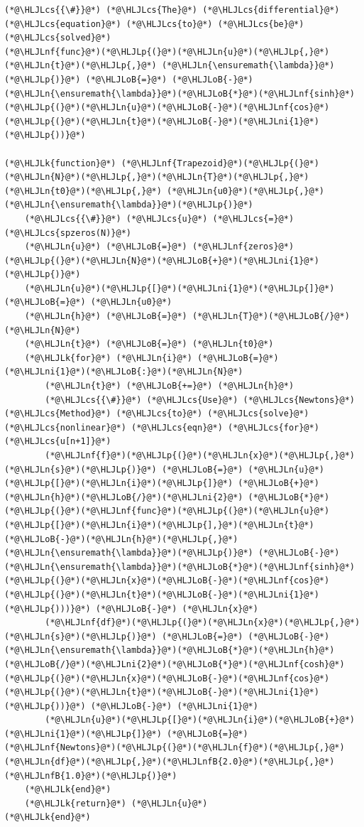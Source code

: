 \documentclass[12pt,a4paper]{article}
\newcommand{\HLJLk}[1]{\textcolor[RGB]{148,91,176}{\textbf{#1}}}
\newcommand{\HLJLn}[1]{#1}
\newcommand{\HLJLnf}[1]{\textcolor[RGB]{66,102,213}{#1}}
\newcommand{\HLJLnfB}[1]{\textcolor[RGB]{59,151,46}{#1}}
\newcommand{\HLJLni}[1]{\textcolor[RGB]{59,151,46}{#1}}
\newcommand{\HLJLoB}[1]{\textcolor[RGB]{102,102,102}{\textbf{#1}}}
\newcommand{\HLJLp}[1]{#1}
\newcommand{\HLJLcs}[1]{\textcolor[RGB]{153,153,119}{\textit{#1}}}
\begin{document}
\begin{lstlisting}
(*@\HLJLcs{{\#}}@*) (*@\HLJLcs{The}@*) (*@\HLJLcs{differential}@*) (*@\HLJLcs{equation}@*) (*@\HLJLcs{to}@*) (*@\HLJLcs{be}@*) (*@\HLJLcs{solved}@*)
(*@\HLJLnf{func}@*)(*@\HLJLp{(}@*)(*@\HLJLn{u}@*)(*@\HLJLp{,}@*) (*@\HLJLn{t}@*)(*@\HLJLp{,}@*) (*@\HLJLn{\ensuremath{\lambda}}@*)(*@\HLJLp{)}@*) (*@\HLJLoB{=}@*) (*@\HLJLoB{-}@*)(*@\HLJLn{\ensuremath{\lambda}}@*)(*@\HLJLoB{*}@*)(*@\HLJLnf{sinh}@*)(*@\HLJLp{(}@*)(*@\HLJLn{u}@*)(*@\HLJLoB{-}@*)(*@\HLJLnf{cos}@*)(*@\HLJLp{(}@*)(*@\HLJLn{t}@*)(*@\HLJLoB{-}@*)(*@\HLJLni{1}@*)(*@\HLJLp{))}@*)

(*@\HLJLk{function}@*) (*@\HLJLnf{Trapezoid}@*)(*@\HLJLp{(}@*)(*@\HLJLn{N}@*)(*@\HLJLp{,}@*)(*@\HLJLn{T}@*)(*@\HLJLp{,}@*)(*@\HLJLn{t0}@*)(*@\HLJLp{,}@*) (*@\HLJLn{u0}@*)(*@\HLJLp{,}@*) (*@\HLJLn{\ensuremath{\lambda}}@*)(*@\HLJLp{)}@*)
    (*@\HLJLcs{{\#}}@*) (*@\HLJLcs{u}@*) (*@\HLJLcs{=}@*) (*@\HLJLcs{spzeros(N)}@*)
    (*@\HLJLn{u}@*) (*@\HLJLoB{=}@*) (*@\HLJLnf{zeros}@*)(*@\HLJLp{(}@*)(*@\HLJLn{N}@*)(*@\HLJLoB{+}@*)(*@\HLJLni{1}@*)(*@\HLJLp{)}@*)
    (*@\HLJLn{u}@*)(*@\HLJLp{[}@*)(*@\HLJLni{1}@*)(*@\HLJLp{]}@*) (*@\HLJLoB{=}@*) (*@\HLJLn{u0}@*)
    (*@\HLJLn{h}@*) (*@\HLJLoB{=}@*) (*@\HLJLn{T}@*)(*@\HLJLoB{/}@*)(*@\HLJLn{N}@*)
    (*@\HLJLn{t}@*) (*@\HLJLoB{=}@*) (*@\HLJLn{t0}@*)
    (*@\HLJLk{for}@*) (*@\HLJLn{i}@*) (*@\HLJLoB{=}@*) (*@\HLJLni{1}@*)(*@\HLJLoB{:}@*)(*@\HLJLn{N}@*)
        (*@\HLJLn{t}@*) (*@\HLJLoB{+=}@*) (*@\HLJLn{h}@*)
        (*@\HLJLcs{{\#}}@*) (*@\HLJLcs{Use}@*) (*@\HLJLcs{Newtons}@*) (*@\HLJLcs{Method}@*) (*@\HLJLcs{to}@*) (*@\HLJLcs{solve}@*) (*@\HLJLcs{nonlinear}@*) (*@\HLJLcs{eqn}@*) (*@\HLJLcs{for}@*) (*@\HLJLcs{u[n+1]}@*)
        (*@\HLJLnf{f}@*)(*@\HLJLp{(}@*)(*@\HLJLn{x}@*)(*@\HLJLp{,}@*)(*@\HLJLn{s}@*)(*@\HLJLp{)}@*) (*@\HLJLoB{=}@*) (*@\HLJLn{u}@*)(*@\HLJLp{[}@*)(*@\HLJLn{i}@*)(*@\HLJLp{]}@*) (*@\HLJLoB{+}@*) (*@\HLJLn{h}@*)(*@\HLJLoB{/}@*)(*@\HLJLni{2}@*) (*@\HLJLoB{*}@*) (*@\HLJLp{(}@*)(*@\HLJLnf{func}@*)(*@\HLJLp{(}@*)(*@\HLJLn{u}@*)(*@\HLJLp{[}@*)(*@\HLJLn{i}@*)(*@\HLJLp{],}@*)(*@\HLJLn{t}@*)(*@\HLJLoB{-}@*)(*@\HLJLn{h}@*)(*@\HLJLp{,}@*)(*@\HLJLn{\ensuremath{\lambda}}@*)(*@\HLJLp{)}@*) (*@\HLJLoB{-}@*) (*@\HLJLn{\ensuremath{\lambda}}@*)(*@\HLJLoB{*}@*)(*@\HLJLnf{sinh}@*)(*@\HLJLp{(}@*)(*@\HLJLn{x}@*)(*@\HLJLoB{-}@*)(*@\HLJLnf{cos}@*)(*@\HLJLp{(}@*)(*@\HLJLn{t}@*)(*@\HLJLoB{-}@*)(*@\HLJLni{1}@*)(*@\HLJLp{)))}@*) (*@\HLJLoB{-}@*) (*@\HLJLn{x}@*)
        (*@\HLJLnf{df}@*)(*@\HLJLp{(}@*)(*@\HLJLn{x}@*)(*@\HLJLp{,}@*)(*@\HLJLn{s}@*)(*@\HLJLp{)}@*) (*@\HLJLoB{=}@*) (*@\HLJLoB{-}@*)(*@\HLJLn{\ensuremath{\lambda}}@*)(*@\HLJLoB{*}@*)(*@\HLJLn{h}@*)(*@\HLJLoB{/}@*)(*@\HLJLni{2}@*)(*@\HLJLoB{*}@*)(*@\HLJLnf{cosh}@*)(*@\HLJLp{(}@*)(*@\HLJLn{x}@*)(*@\HLJLoB{-}@*)(*@\HLJLnf{cos}@*)(*@\HLJLp{(}@*)(*@\HLJLn{t}@*)(*@\HLJLoB{-}@*)(*@\HLJLni{1}@*)(*@\HLJLp{))}@*) (*@\HLJLoB{-}@*) (*@\HLJLni{1}@*)
        (*@\HLJLn{u}@*)(*@\HLJLp{[}@*)(*@\HLJLn{i}@*)(*@\HLJLoB{+}@*)(*@\HLJLni{1}@*)(*@\HLJLp{]}@*) (*@\HLJLoB{=}@*) (*@\HLJLnf{Newtons}@*)(*@\HLJLp{(}@*)(*@\HLJLn{f}@*)(*@\HLJLp{,}@*)(*@\HLJLn{df}@*)(*@\HLJLp{,}@*)(*@\HLJLnfB{2.0}@*)(*@\HLJLp{,}@*)(*@\HLJLnfB{1.0}@*)(*@\HLJLp{)}@*)
    (*@\HLJLk{end}@*)
    (*@\HLJLk{return}@*) (*@\HLJLn{u}@*)
(*@\HLJLk{end}@*)


\end{lstlisting}
\end{document}

